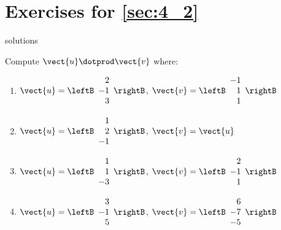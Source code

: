 \section*{Exercises for \ref{sec:4_2}}

\begin{Filesave}{solutions}
\end{Filesave}

\begin{multicols}{2}
\begin{ex}
Compute $\vect{u} \dotprod \vect{v}$ where:

\begin{enumerate}[label={\alph*.}]
\item $\vect{u} = \leftB
\begin{array}{r}
2\\
-1\\
3
\end{array}
\rightB$, 
$\vect{v} = \leftB
\begin{array}{r}
-1\\
1\\
1
\end{array}
\rightB
$

\item $\vect{u} = \leftB
\begin{array}{r}
1\\
2\\
-1
\end{array}
\rightB$,
$\vect{v} = \vect{u}
$


\item $\vect{u} = \leftB
\begin{array}{r}
1\\
1\\
-3
\end{array}
\rightB$, 
$\vect{v} = \leftB
\begin{array}{r}
2\\
-1\\
1
\end{array}
\rightB
$

\item $\vect{u} = \leftB
\begin{array}{r}
3\\
-1\\
5
\end{array}
\rightB$, 
$\vect{v} = \leftB
\begin{array}{r}
6\\
-7\\
-5
\end{array}
\rightB
$


\end{enumerate}
\end{ex}
\end{multicols}
